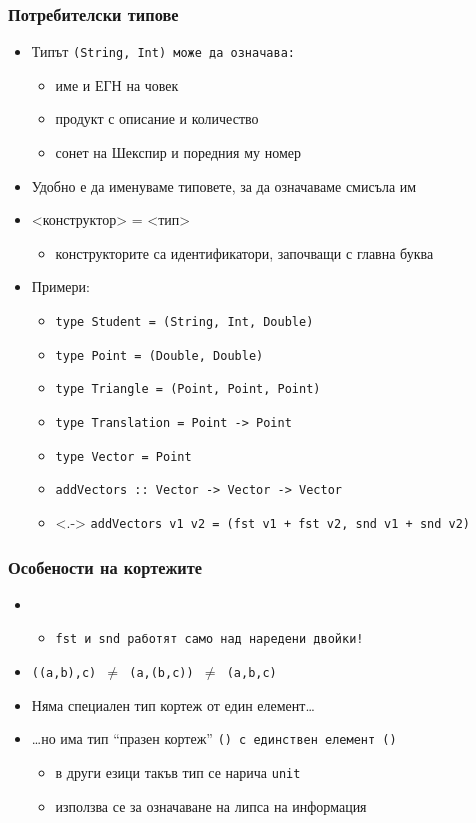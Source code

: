 \documentclass{beamer}
\begin{document}
\begin{frame}
  \frametitle{Потребителски типове}
  \begin{itemize}[<+->]
  \item Типът \tt{(String, Int)} може да означава:
    \begin{itemize}
    \item име и ЕГН на човек
    \item продукт с описание и количество
    \item сонет на Шекспир и поредния му номер
    \end{itemize}
  \item Удобно е да именуваме типовете, за да означаваме смисъла им
  \item {}<конструктор> \tta= <тип>
    \begin{itemize}
    \item конструкторите са идентификатори, започващи с главна буква
    \end{itemize}
  \item Примери:
    \begin{itemize}
    \item \tt{type Student = (String, Int, Double)}
    \item \tt{type Point = (Double, Double)}
    \item \tt{type Triangle = (Point, Point, Point)}
    \item \tt{type Translation = Point -> Point}
    \item \tt{type Vector = Point}
    \item \tt{addVectors :: Vector -> Vector -> Vector}
    \item<.-> \tt{addVectors v1 v2 = (fst v1 + fst v2, snd v1 + snd v2)}
    \end{itemize}
  \end{itemize}
\end{frame}

\begin{frame}
  \frametitle{Особености на кортежите}
  \begin{itemize}[<+->]
  \item {}
    \begin{itemize}
    \item \tt{fst} и \tt{snd} работят само над наредени двойки!
    \end{itemize}
  \item \tt{((a,b),c)} $\neq$ \tt{(a,(b,c))} $\neq$ \tt{(a,b,c)}
  \item Няма специален тип кортеж от един елемент\ldots
  \item \ldots но има тип ``празен кортеж'' \tt{()} с единствен елемент \tt{()}
    \begin{itemize}
    \item в други езици такъв тип се нарича \tt{unit}
    \item използва се за означаване на липса на информация
    \end{itemize}
  \end{itemize}
\end{frame}
\end{document}
